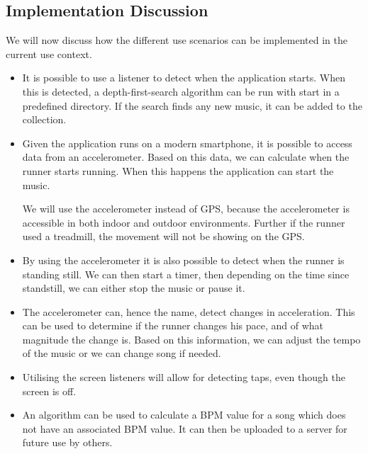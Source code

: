 \subsection{Implementation Discussion}
We will now discuss how the different use scenarios can be implemented in the current use context.
\begin{itemize}
	\item It is possible to use a listener to detect when the application starts. When this is detected, a depth-first-search algorithm can be run with start in a predefined directory. If the search finds any new music, it can be added to the collection.
	
	\item Given the application runs on a modern smartphone, it is possible to access data from an accelerometer. Based on this data, we can calculate when the runner starts running. When this happens the application can start the music.
	
	We will use the accelerometer instead of GPS, because the accelerometer is accessible in both indoor and outdoor environments. Further if the runner used a treadmill, the movement will not be showing on the GPS.
	
	\item By using the accelerometer it is also possible to detect when the runner is standing still. We can then start a timer, then depending on the time since standstill, we can either stop the music or pause it.
	
	\item The accelerometer can, hence the name, detect changes in acceleration.
	This can be used to determine if the runner changes his pace, and of what magnitude the change is.
	Based on this information, we can adjust the tempo of the music or we can change song if needed.
	
	\item Utilising the screen listeners will allow for detecting taps, even though the screen is off.
	
	\item An algorithm can be used to calculate a BPM value for a song which does not have an associated BPM value. It can then be uploaded to a server for future use by others. 
\end{itemize}